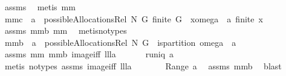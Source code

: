\begin{isabellebody}
%
\isadelimproof
%
\endisadelimproof
%
\isatagproof
{}\isamarkupfalse%
\ assms\ \isamarkupfalse%
\ {\isacharparenleft}metis\ mm{}{}{\isacharparenright}%
\endisatagproof
{\isafoldproof}%
%
\isadelimproof
\isanewline
%
\endisadelimproof
\isanewline
{}\isamarkupfalse%
\ mm{}{}c{\isacharcolon}\ \ {\isachardoublequoteopen}a\ {\isasymin}\ possibleAllocationsRel\ N\ G{\isachardoublequoteclose}\ {\isachardoublequoteopen}finite\ G{\isachardoublequoteclose}\ \ {\isachardoublequoteopen}{\isasymforall}x{\isasymin}{\isacharparenleft}omega\ {\isacharbackquote}\ a{\isacharparenright}{\isachardot}\ finite\ x{\isachardoublequoteclose}\ \isanewline
%
\isadelimproof
%
\endisadelimproof
%
\isatagproof
{}\isamarkupfalse%
\ assms\ mm{}{}b\ mm{}{}\ \isamarkupfalse%
\ {\isacharparenleft}metis{\isacharparenleft}no{\isacharunderscore}types{\isacharparenright}{\isacharparenright}%
\endisatagproof
{\isafoldproof}%
%
\isadelimproof
\isanewline
%
\endisadelimproof
\isanewline
{}\isamarkupfalse%
\ mm{}{}b{\isacharcolon}\ \ {\isachardoublequoteopen}a\ {\isasymin}\ possibleAllocationsRel\ N\ G{\isachardoublequoteclose}\ \ {\isachardoublequoteopen}is{\isacharunderscore}partition\ {\isacharparenleft}omega\ {\isacharbackquote}\ a{\isacharparenright}{\isachardoublequoteclose}\isanewline
%
\isadelimproof
%
\endisadelimproof
%
\isatagproof
{}\isamarkupfalse%
\ assms\ mm{}{}\ mm{}{}b\ image{\isacharunderscore}iff\ lll{}{}a\ \isanewline
{}\isamarkupfalse%
\ {\isacharminus}\isanewline
\ \ \isamarkupfalse%
\ {\isachardoublequoteopen}runiq\ a{\isachardoublequoteclose}\ \isamarkupfalse%
\ {\isacharparenleft}metis\ {\isacharparenleft}no{\isacharunderscore}types{\isacharparenright}\ assms\ image{\isacharunderscore}iff\ lll{}{}a{\isacharparenright}\isanewline
\ \ \isamarkupfalse%
\ \isamarkupfalse%
\ {\isachardoublequoteopen}{\isacharbraceleft}{\isacharbraceright}\ {\isasymnotin}\ Range\ a{\isachardoublequoteclose}\ \isamarkupfalse%
\ assms\ mm{}{}b\ \isamarkupfalse%
\ blast\isanewline
\ \ \isamarkupfalse%
\ \isamarkupfalse%

\end{isabellebody}
